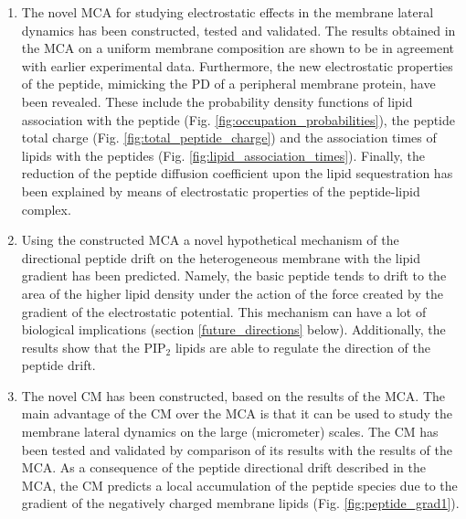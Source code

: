\begin{enumerate}
 \item The novel MCA for studying electrostatic effects in the membrane lateral dynamics has been constructed, tested and validated. The results obtained in the MCA on a uniform membrane composition are shown to be in agreement with earlier experimental data. Furthermore, the new electrostatic properties of the peptide, mimicking the PD of a peripheral membrane protein, have been revealed. These include the probability density functions of lipid association with the peptide (Fig. \ref{fig:occupation_probabilities}), the peptide total charge (Fig. \ref{fig:total_peptide_charge}) and the association times of lipids with the peptides (Fig. \ref{fig:lipid_association_times}). Finally, the reduction of the peptide diffusion coefficient upon the lipid sequestration has been explained by means of electrostatic properties of the peptide-lipid complex.
 \item Using the constructed MCA a novel hypothetical mechanism of the directional peptide drift on the heterogeneous membrane with the lipid gradient has been predicted. Namely, the basic peptide tends to drift to the area of the higher lipid density under the action of the force created by the gradient of the electrostatic potential. This mechanism can have a lot of biological implications (section \ref{future_directions} below). Additionally, the results show that the PIP$_2$ lipids are able to regulate the direction of the peptide drift.
 \item The novel CM has been constructed, based on the results of the MCA. The main advantage of the CM over the MCA is that it can be used to study the membrane lateral dynamics on the large (micrometer) scales. The CM has been tested and validated by comparison of its results with the results of the MCA. As a consequence of the peptide directional drift described in the MCA, the CM predicts a local accumulation of the peptide species due to the gradient of the negatively charged membrane lipids (Fig. \ref{fig:peptide_grad1}).
\end{enumerate}

